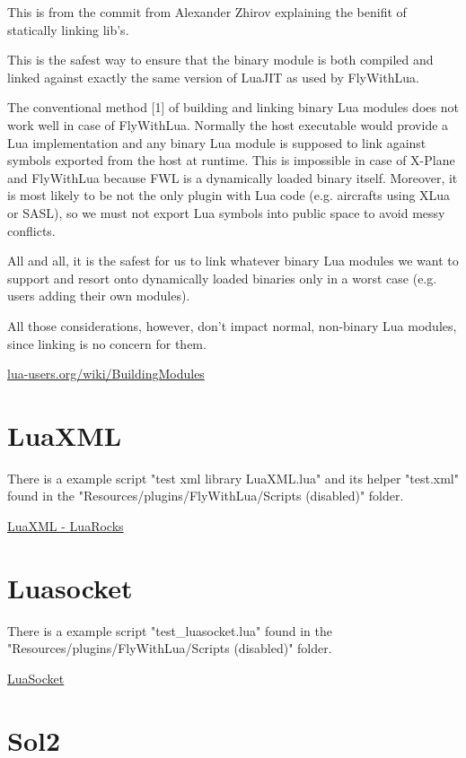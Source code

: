 \documentclass[11pt,parskip=half,a4paper]{scrartcl}
\begin{document}
This is from the commit from Alexander Zhirov explaining the benifit of statically linking lib's.

This is the safest way to ensure that the binary module is both compiled
and linked against exactly the same version of LuaJIT as used by
FlyWithLua.

The conventional method [1] of building and linking binary Lua modules
does not work well in case of FlyWithLua. Normally the host executable
would provide a Lua implementation and any binary Lua module is supposed
to link against symbols exported from the host at runtime. This is
impossible in case of X-Plane and FlyWithLua because FWL is a
dynamically loaded binary itself. Moreover, it is most likely to be not
the only plugin with Lua code (e.g. aircrafts using XLua or SASL), so we
must not export Lua symbols into public space to avoid messy conflicts.

All and all, it is the safest for us to link whatever binary Lua modules
we want to support and resort onto dynamically loaded binaries only in a
worst case (e.g. users adding their own modules).

All those considerations, however, don't impact normal, non-binary Lua
modules, since linking is no concern for them.

\href{http://lua-users.org/wiki/BuildingModules}{lua-users.org/wiki/BuildingModules}

\newpage
\section{LuaXML}

There is a example script "test xml library LuaXML.lua" and its helper "test.xml" found in the "Resources/plugins/FlyWithLua/Scripts (disabled)" folder.

\href{https://luarocks.org/modules/djerius/luaxml}{LuaXML - LuaRocks}

\section{Luasocket}

There is a example script "test\_luasocket.lua"  found in the "Resources/plugins/FlyWithLua/Scripts (disabled)" folder.

\href{https://github.com/diegonehab/luasocket}{LuaSocket}

\section{Sol2}
\end{document}
